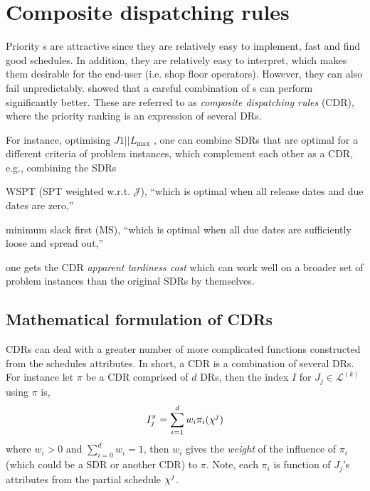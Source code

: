 \clearpage
\section{Composite dispatching rules}\label{sec:CDR}

Priority \dr s are attractive since they are relatively easy to 
implement, fast and find good schedules. In addition, they are relatively easy 
to interpret, which makes them desirable for the end-user (i.e. shop floor 
operators). However, they can also fail unpredictably. 
\citet{Jayamohan04} showed that a careful combination of \dr s can 
perform significantly better. These are referred to as \emph{composite 
dispatching rules} (CDR), where the priority ranking is an expression of 
several DRs. 

For instance, optimising $J1||L_{\max}$ \cite[see. chapter 14.2]{Pinedo08}, one 
can combine SDRs that are optimal for a different criteria of problem 
instances, which complement each other as a CDR, e.g., combining the SDRs 
\begin{enumerate*}[after={{}}]
    \item WSPT (SPT weighted w.r.t. $\mathcal{J}$), ``which is optimal when all 
    release dates and due dates are zero,'' 
    \item minimum slack first (MS), ``which is optimal when all due dates are 
    sufficiently loose and spread out,'' 
\end{enumerate*}
one gets the CDR \emph{apparent tardiness cost} which can work well on a 
broader set of problem instances than the original SDRs by themselves.

\subsection*{Mathematical formulation of CDRs}

CDRs can deal with a greater number of more complicated functions constructed 
from the schedules attributes. In short, a CDR is a combination of several DRs. 
For instance let $\pi$ be a CDR comprised of $d$ DRs, then the index $I$ for 
$J_j\in\mathcal{L}^{(k)}$ using $\pi$ is, 
\begin{equation}
    I_j^{\pi} = \sum_{i=1}^d w_i \pi_i(\vchi^j) \label{eq:CDR}
\end{equation}
where $w_i>0$ and $\sum_{i=0}^d w_i = 1$, then $w_i$ gives the \emph{weight} of 
the influence of $\pi_i$ (which could be a SDR or another CDR) to $\pi$. Note, 
each $\pi_i$ is function of $J_j$'s attributes from the partial schedule
${\mathbf{\chi}}^j$.

